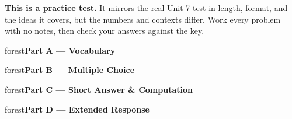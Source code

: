 \documentclass[10pt]{article}
\newcommand{\parthead}[1]{%
  \vspace{6pt}\noindent
  \begin{headlinebox}{forest}\color{white}\bfseries #1\end{headlinebox}%
  \vspace{4pt}}
\begin{document}
\namedateperiod

\vspace{0.10in}
\begin{remindbox}
\small
\textbf{This is a practice test.} It mirrors the real Unit 7 test in length, format,
and the ideas it covers, but the numbers and contexts differ. Work every problem
with no notes, then check your answers against the key.
\end{remindbox}

\parthead{Part A --- Vocabulary}

\parthead{Part B --- Multiple Choice}

\parthead{Part C --- Short Answer \& Computation}

\parthead{Part D --- Extended Response}
\end{document}
